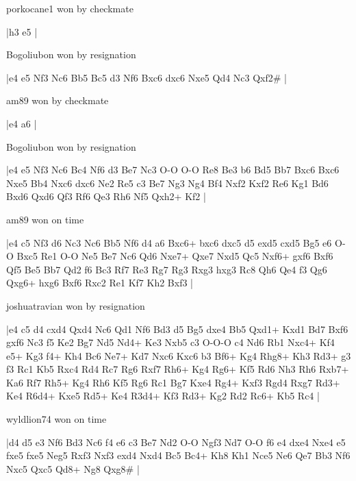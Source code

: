 porkocane1 won by checkmate

\makegametitle
|h3 e5  |

\showboard

Bogoliubon won by resignation

\makegametitle
|e4 e5 Nf3 Nc6 Bb5 Bc5 d3 Nf6 Bxc6 dxc6 Nxe5 Qd4 Nc3 Qxf2\#  |

\showboard

am89 won by checkmate

\makegametitle
|e4 a6  |

\showboard

Bogoliubon won by resignation

\makegametitle
|e4 e5 Nf3 Nc6 Bc4 Nf6 d3 Be7 Nc3 O-O O-O Re8 Be3 b6 Bd5 Bb7 Bxc6 Bxc6 Nxe5 Bb4 Nxc6 dxc6 Ne2 Re5 c3 Be7 Ng3 Ng4 Bf4 Nxf2 Kxf2 Re6 Kg1 Bd6 Bxd6 Qxd6 Qf3 Rf6 Qe3 Rh6 Nf5 Qxh2+ Kf2  |

\showboard

am89 won on time

\makegametitle
|e4 c5 Nf3 d6 Nc3 Nc6 Bb5 Nf6 d4 a6 Bxc6+ bxc6 dxc5 d5 exd5 cxd5 Bg5 e6 O-O Bxc5 Re1 O-O Ne5 Be7 Nc6 Qd6 Nxe7+ Qxe7 Nxd5 Qc5 Nxf6+ gxf6 Bxf6 Qf5 Be5 Bb7 Qd2 f6 Bc3 Rf7 Re3 Rg7 Rg3 Rxg3 hxg3 Rc8 Qh6 Qe4 f3 Qg6 Qxg6+ hxg6 Bxf6 Rxc2 Re1 Kf7 Kh2 Bxf3  |

\showboard

joshuatravian won by resignation

\makegametitle
|e4 c5 d4 cxd4 Qxd4 Nc6 Qd1 Nf6 Bd3 d5 Bg5 dxe4 Bb5 Qxd1+ Kxd1 Bd7 Bxf6 gxf6 Nc3 f5 Ke2 Bg7 Nd5 Nd4+ Ke3 Nxb5 c3 O-O-O c4 Nd6 Rb1 Nxc4+ Kf4 e5+ Kg3 f4+ Kh4 Bc6 Ne7+ Kd7 Nxc6 Kxc6 b3 Bf6+ Kg4 Rhg8+ Kh3 Rd3+ g3 f3 Rc1 Kb5 Rxc4 Rd4 Rc7 Rg6 Rxf7 Rh6+ Kg4 Rg6+ Kf5 Rd6 Nh3 Rh6 Rxb7+ Ka6 Rf7 Rh5+ Kg4 Rh6 Kf5 Rg6 Rc1 Bg7 Kxe4 Rg4+ Kxf3 Rgd4 Rxg7 Rd3+ Ke4 R6d4+ Kxe5 Rd5+ Ke4 R3d4+ Kf3 Rd3+ Kg2 Rd2 Rc6+ Kb5 Rc4  |

\showboard

wyldlion74 won on time

\makegametitle
|d4 d5 e3 Nf6 Bd3 Nc6 f4 e6 c3 Be7 Nd2 O-O Ngf3 Nd7 O-O f6 e4 dxe4 Nxe4 e5 fxe5 fxe5 Neg5 Rxf3 Nxf3 exd4 Nxd4 Bc5 Bc4+ Kh8 Kh1 Nce5 Ne6 Qe7 Bb3 Nf6 Nxc5 Qxc5 Qd8+ Ng8 Qxg8\#  |

